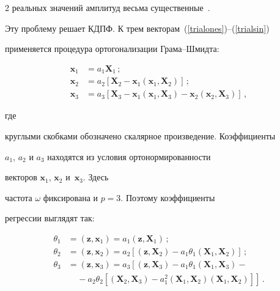 \begin{multicols}{2}
реальных значений амплитуд весьма существенные~\cite{8ma}.








Эту проблему решает КДПФ. К трем векторам~(\ref{trialones})--(\ref{trialsin})


применяется процедура ортогонализации Грама--Шмидта:


\begin{align*}


\mathbf{x}_1 &= a_1 \mathbf{X}_1\,; \\


\mathbf{x}_2 &= a_2 \left[ \mathbf{X}_2 - \mathbf{x}_1(\mathbf{x}_1,\mathbf{X}_2) \right]\,; \\


\mathbf{x}_3 &= a_3 \left[ \mathbf{X}_3 -


\mathbf{x}_1(\mathbf{x}_1,\mathbf{X}_3) -


\mathbf{x}_2(\mathbf{x}_2,\mathbf{X}_3) \right]\,,


\end{align*}


где


круглыми скобками обозначено скалярное произведение. Коэффициенты


$a_1$, $a_2$ и $a_3$ находятся из условия ортонормированности


векторов $\mathbf{x}_1$, $\mathbf{x}_2$ и~$\mathbf{x}_3$. Здесь


частота $\omega$ фиксирована и $p=3$. Поэтому коэффициенты


регрессии выглядят так:


\begin{align*}




\theta_1 & = (\mathbf{z},\mathbf{x}_1) = a_1 (\mathbf{z},\mathbf{X}_1)\,; \\


\theta_2 &= (\mathbf{z},\mathbf{x}_2) = a_2 \left[ (\mathbf{z},\mathbf{X}_2)-a_1\theta_1(\mathbf{X}_1,\mathbf{X}_2) \right]\,; \\


\theta_3 &= (\mathbf{z},\mathbf{x}_3) = a_3 \left[ (\mathbf{z},\mathbf{X}_3)-a_1\theta_1(\mathbf{X}_1,\mathbf{X}_3)-{} \right.  \\


 &\ \ \ \ \ {}- \left.a_2\theta_2[(\mathbf{X}_2,\mathbf{X}_3)-a_1^2(\mathbf{X}_1,\mathbf{X}_2)(\mathbf{X}_1,\mathbf{X}_2)] \right]\,.



\end{align*}
\end{multicols}
